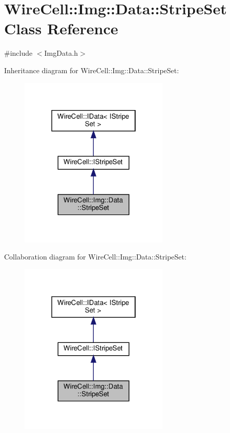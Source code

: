 \hypertarget{class_wire_cell_1_1_img_1_1_data_1_1_stripe_set}{}\section{Wire\+Cell\+:\+:Img\+:\+:Data\+:\+:Stripe\+Set Class Reference}
\label{class_wire_cell_1_1_img_1_1_data_1_1_stripe_set}


{\ttfamily \#include $<$Img\+Data.\+h$>$}



Inheritance diagram for Wire\+Cell\+:\+:Img\+:\+:Data\+:\+:Stripe\+Set\+:
\nopagebreak
\begin{figure}[H]
\begin{center}
\leavevmode
\includegraphics[width=202pt]{class_wire_cell_1_1_img_1_1_data_1_1_stripe_set__inherit__graph}
\end{center}
\end{figure}


Collaboration diagram for Wire\+Cell\+:\+:Img\+:\+:Data\+:\+:Stripe\+Set\+:
\nopagebreak
\begin{figure}[H]
\begin{center}
\leavevmode
\includegraphics[width=202pt]{class_wire_cell_1_1_img_1_1_data_1_1_stripe_set__coll__graph}
\end{center}
\end{figure}
